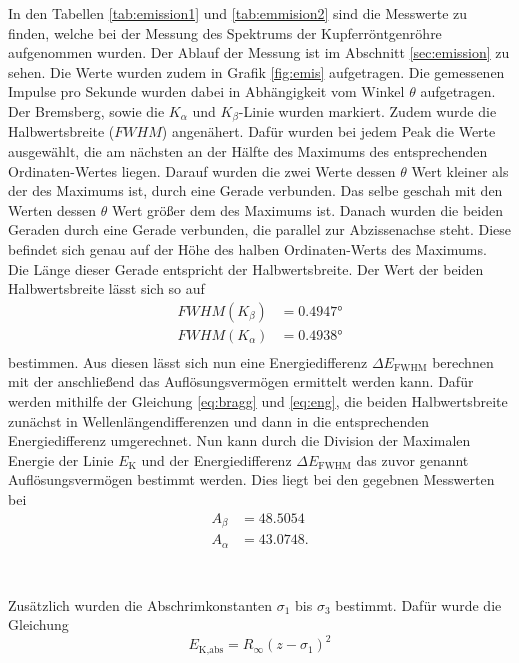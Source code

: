 In den Tabellen \ref{tab:emission1} und \ref{tab:emmision2} sind die Messwerte zu finden, welche bei der Messung des Spektrums der Kupferröntgenröhre aufgenommen wurden.
Der Ablauf der Messung ist im Abschnitt \ref{sec:emission} zu sehen.
Die Werte wurden zudem in Grafik \ref{fig:emis} aufgetragen.
Die gemessenen Impulse pro Sekunde wurden dabei in Abhängigkeit vom Winkel $\theta$ aufgetragen.
Der Bremsberg, sowie die $K_\alpha$ und $K_\beta$-Linie wurden markiert.
Zudem wurde die Halbwertsbreite ($FWHM$) angenähert.
Dafür wurden bei jedem Peak die Werte ausgewählt, die am nächsten an der Hälfte des Maximums des entsprechenden Ordinaten-Wertes liegen.
Darauf wurden die zwei Werte dessen $\theta$ Wert kleiner als der des Maximums ist, durch eine Gerade verbunden.
Das selbe geschah mit den Werten dessen $\theta$ Wert größer dem des Maximums ist.
Danach wurden die beiden Geraden durch eine Gerade verbunden, die parallel zur Abzissenachse steht.
Diese befindet sich genau auf der Höhe des halben Ordinaten-Werts des Maximums.
Die Länge dieser Gerade entspricht der Halbwertsbreite.
Der Wert der beiden Halbwertsbreite lässt sich so auf
\begin{align*}
    FWHM(K_\beta) &=  0.4947 \si{\degree} \\
    FWHM(K_\alpha) &=  0.4938 \si{\degree} \\
\end{align*}
bestimmen.
Aus diesen lässt sich nun eine Energiedifferenz $\Delta E_\text{FWHM}$ berechnen mit der anschließend das Auflösungsvermögen ermittelt werden kann.
Dafür werden mithilfe der Gleichung \eqref{eq:bragg} und \eqref{eq:eng}, die beiden Halbwertsbreite zunächst in Wellenlängendifferenzen und dann in die entsprechenden Energiedifferenz umgerechnet.
Nun kann durch die Division der Maximalen Energie der Linie $E_\text{K}$ und der Energiedifferenz $\Delta E_\text{FWHM}$ das zuvor genannt Auflösungsvermögen bestimmt werden.
Dies liegt bei den gegebnen Messwerten bei 
\begin{align*}
    A_\beta &= 48.5054 \\
    A_\alpha &=  43.0748. \\
\end{align*}
\\\\
Zusätzlich wurden die Abschrimkonstanten $\sigma_1$ bis $\sigma_3$ bestimmt.
Dafür wurde die Gleichung
\begin{equation*}
  E_\text{K,abs} = R_\infty (z-\sigma_1)^2
  \label{eq:sigma1}
\end{equation*}
